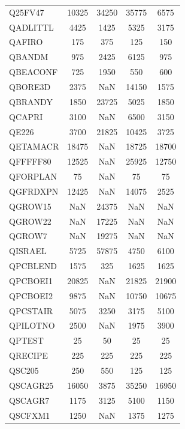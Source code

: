 \begin{longtable}{lcccc}
Q25FV47  &    10325 & 34250 &    35775 &     6575 \\
QADLITTL &     4425 &  1425 &     5325 &     3175 \\
QAFIRO   &      175 &   375 &      125 &      150 \\
QBANDM   &      975 &  2425 &     6125 &      975 \\
QBEACONF &      725 &  1950 &      550 &      600 \\
QBORE3D  &     2375 &   NaN &    14150 &     1575 \\
QBRANDY  &     1850 & 23725 &     5025 &     1850 \\
QCAPRI   &     3100 &   NaN &     6500 &     3150 \\
QE226    &     3700 & 21825 &    10425 &     3725 \\
QETAMACR &    18475 &   NaN &    18725 &    18700 \\
QFFFFF80 &    12525 &   NaN &    25925 &    12750 \\
QFORPLAN &       75 &   NaN &       75 &       75 \\
QGFRDXPN &    12425 &   NaN &    14075 &     2525 \\
QGROW15  &      NaN & 24375 &      NaN &      NaN \\
QGROW22  &      NaN & 17225 &      NaN &      NaN \\
QGROW7   &      NaN & 19275 &      NaN &      NaN \\
QISRAEL  &     5725 & 57875 &     4750 &     6100 \\
QPCBLEND &     1575 &   325 &     1625 &     1625 \\
QPCBOEI1 &    20825 &   NaN &    21825 &    21900 \\
QPCBOEI2 &     9875 &   NaN &    10750 &    10675 \\
QPCSTAIR &     5075 &  3250 &     3175 &     5100 \\
QPILOTNO &     2500 &   NaN &     1975 &     3900 \\
QPTEST   &       25 &    50 &       25 &       25 \\
QRECIPE  &      225 &   225 &      225 &      225 \\
QSC205   &      250 &   550 &      125 &      125 \\
QSCAGR25 &    16050 &  3875 &    35250 &    16950 \\
QSCAGR7  &     1175 &  3125 &     5100 &     1150 \\
QSCFXM1  &     1250 &   NaN &     1375 &     1275 \\

\end{longtable}
